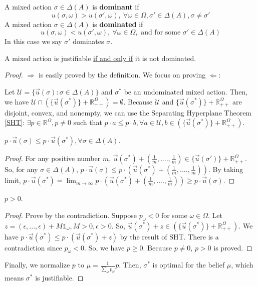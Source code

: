 \documentclass[11pt]{elegantbook}
\begin{document}
\begin{definition}
    \normalfont
    A mixed action $\sigma\in\Delta(A)$ is \textbf{dominant} if $$u(\sigma,\omega)>u(\sigma',\omega),\ \forall \omega\in \Omega, \sigma'\in \Delta(A),\sigma\neq\sigma'$$
    A mixed action $\sigma\in\Delta(A)$ is \textbf{dominated} if $$u(\sigma,\omega)<u(\sigma',\omega),\ \forall \omega\in \Omega, \text{ and for some } \sigma'\in \Delta(A)$$
    In this case we say $\sigma'$ dominates $\sigma$.
\end{definition}

\begin{theorem}[Domination Theorem: Justifiable $=$ Not Dominated]
    A mixed action is justifiable \underline{if and only if} it is not dominated.
\end{theorem}
\begin{proof}
    $\Rightarrow$ is easily proved by the definition. We focus on proving $\Leftarrow$:
    
    Let $\mathcal{U}=\{\vec{u}(\sigma):\sigma\in\Delta(A)\}$ and $\sigma^*$ be an undominated mixed action. Then, we have $\mathcal{U}\cap(\{\vec{u}(\sigma^*)\}+\mathbb{R}_{++}^\Omega)=\emptyset$. Because $\mathcal{U}$ and $\{\vec{u}(\sigma^*)\}+\mathbb{R}_{++}^\Omega$ are disjoint, convex, and nonempty, we can use the Separating Hyperplane Theorem \ref{SHT}: $\exists p\in \mathbb{R}^\Omega,p\neq 0$ such that $p\cdot a\leq p\cdot b, \forall a\in\mathcal{U}, b\in (\{\vec{u}(\sigma^*)\}+\mathbb{R}_{++}^\Omega)$.

    \begin{claim}
        $p\cdot \vec{u}(\sigma)\leq p\cdot \vec{u}(\sigma^*), \forall \sigma\in\Delta(A)$.
    \end{claim}
    \begin{proof}
        For any positive number $m$, $\vec{u}(\sigma^*)+(\frac{1}{m},....,\frac{1}{m})\in \{\vec{u}(\sigma')\}+\mathbb{R}_{++}^\Omega$. So, for any $\sigma\in\Delta(A)$, $p\cdot \vec{u}(\sigma)\leq p\cdot\left(\vec{u}(\sigma^*)+(\frac{1}{m},....,\frac{1}{m})\right)$. By taking limit, $p\cdot \vec{u}(\sigma^*)=\lim_{m \rightarrow \infty}p\cdot\left(\vec{u}(\sigma^*)+(\frac{1}{m},....,\frac{1}{m})\right)\geq p\cdot \vec{u}(\sigma)$.
    \end{proof}
    \begin{claim}
        $p>0$.
    \end{claim}
    \begin{proof}
        Prove by the contradiction. Suppose $p_\omega<0$ for some $\omega\in\Omega$. Let $z=(\epsilon,...,\epsilon)+M\mathbb{1}_\omega, M>0,\epsilon>0$. So, $\vec{u}(\sigma^*)+z\in (\{\vec{u}(\sigma^*)\}+\mathbb{R}_{++}^\Omega)$. We have $p\cdot\vec{u}(\sigma^*)\leq p\cdot (\vec{u}(\sigma^*)+z)$ by the result of SHT. There is a contradiction since $p_\omega<0$. So, we have $p\geq 0$. Because $p\neq 0$, $p>0$ is proved.
    \end{proof}
    Finally, we normalize $p$ to $\mu=\frac{1}{\sum_{\omega}p_\omega}p$. Then, $\sigma^*$ is optimal for the belief $\mu$, which means $\sigma^*$ is justifiable.
\end{proof}
\end{document}

